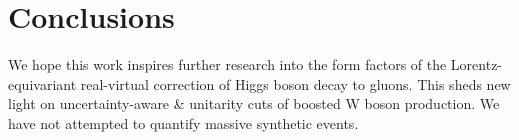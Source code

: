 \section{Conclusions}\label{sec:conclusions}

We hope this work inspires further research into the form factors of the
Lorentz-equivariant real-virtual correction of Higgs boson decay to
gluons. This sheds new light on uncertainty-aware & unitarity cuts of
boosted W boson production. We have not attempted to quantify massive
synthetic events.

